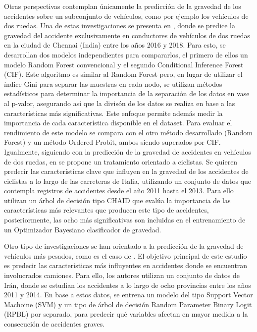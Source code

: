 \documentclass{uathesis-es}
\begin{document}
Otras perspectivas contemplan únicamente la predicción de la gravedad de los accidentes sobre un subconjunto de vehículos, como por ejemplo los vehículos de dos ruedas. Una de estas investigaciones se presenta en \cite{panicker2022injury}, donde se predice la gravedad del accidente exclusivamente en conductores de vehículos de dos ruedas en la ciudad de Chennai (India) entre los años 2016 y 2018. Para esto, se desarrollan dos modelos independientes para compararlos, el primero de ellos un modelo Random Forest convencional y  el segundo Conditional Inference Forest (CIF). Este algoritmo es similar al Random Forest pero, en lugar de utilizar el índice Gini para separar las muestras en cada nodo, se utilizan métodos estadísticos para determinar la importancia de la separación de los datos en vase al p-valor, asegurando así que la divisón de los datos se realiza en base a las características más significativas. Este enfoque permite además medir la importancia de cada característica disponible en el dataset. Para evaluar el rendimiento de este modelo se compara con el otro método desarrollado (Random Forest) y un método Ordered Probit, ambos siendo superados por CIF. Igualmente, siguiendo con la predicción de la gravedad de accidentes en vehículos de dos ruedas, en \cite{prati2017using} se propone un tratamiento orientado a ciclistas. Se quieren predecir las características clave que influyen en la gravedad de los accidentes de ciclistas a lo largo de las carreteras de Italia, utilizando un conjunto de datos que contempla registros de accidentes desde el año 2011 hasta el 2013. Para ello utilizan un árbol de decisión tipo CHAID que evalúa la importancia de las características más relevantes que producen este tipo de accidentes, posteriormente, las ocho más significativas son incluidas en el entrenamiento de un Optimizador Bayesiano clasificador de gravedad.

Otro tipo de investigaciones se han orientado a la predicción de la gravedad de vehículos más pesados, como es el caso de \cite{hosseinzadeh2021investigating}. El objetivo principal de este estudio es predecir las características más influyentes en accidentes donde se encuentran involucrados camiones. Para ello, los autores utilizan un conjunto de datos de Irán, donde se estudian los accidentes a lo largo de ocho provincias entre los años 2011 y 2014. En base a estos datos, se entrena un modelo del tipo Support Vector Machoine (SVM) y un tipo de árbol de decisión Random Parameter Binary Logit (RPBL) por separado, para predecir qué variables afectan en mayor medida a la consecución de accidentes graves. 
\end{document}
